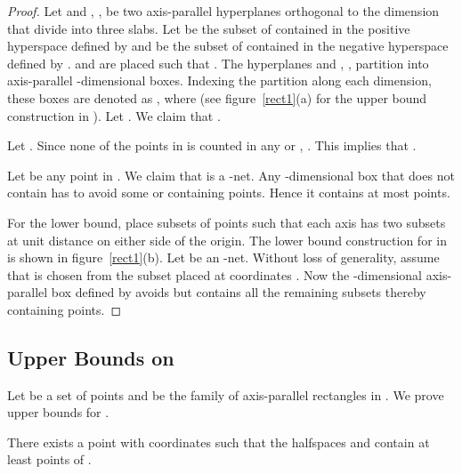 \begin{proof}
Let  and , , be two axis-parallel hyperplanes orthogonal to the  dimension that divide  into three slabs. Let  be the subset of  contained in the positive hyperspace defined by    and  be the subset of  contained in the negative hyperspace defined by   .  and  are placed such that . The hyperplanes  and , , partition  into 
axis-parallel -dimensional boxes. Indexing the partition along each
dimension, these boxes are denoted as ,
where  (see figure~\ref{rect1}(a) for the upper bound construction in ). Let . We claim that . 

Let . Since none of the points in   is counted in any
 or , . This implies that
. 

Let  be any point in . We claim that
 is a -net. Any -dimensional
box that does not contain  has to avoid some  or  containing
 points. Hence it contains at most  points.

For the lower bound, place  subsets of  points such that each axis has two subsets at unit distance on either side of the origin. The lower bound construction for  in  is shown in figure~\ref{rect1}(b). Let  be an -net. Without loss of generality, assume that  is chosen from the subset placed at coordinates .
Now the -dimensional axis-parallel box defined by  avoids
 but contains all the
remaining  subsets thereby containing  points.



\end{proof}



\noindent

\subsection{Upper Bounds on }
\noindent Let  be a set of  points and  be the family of axis-parallel rectangles in . We prove upper bounds for .
\begin{lem}\label{halfhalf}
There exists a point  with coordinates
 such that the
halfspaces  and  contain at least  points of .
\end{lem}

